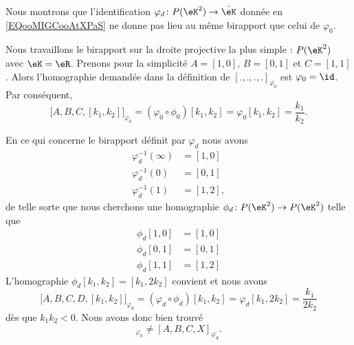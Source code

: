 \begin{example}        \label{EXooYCOYooWFSfUv}
    Nous montrons que l'identification \( \varphi_d\colon P(\eK^2)\to \hat\eK\) donnée en \eqref{EQooMIGCooAtXPaS} ne donne pas lieu au même birapport que celui de \( \varphi_0\). 

    Nous travaillons le birapport sur la droite projective la plus simple : \( P(\eK^2)\) avec \( \eK=\eR\). Prenons pour la simplicité \( A=[1,0]\), \( B=[0,1]\) et \( C=[1,1]\). Alors l'homographie demandée dans la définition de \( [.,.,.,.]_{\varphi_0}\) est \( \varphi_0=\id\). Par conséquent,
    \begin{equation}
        \big[ A,B,C,[k_1,k_2] \big]_{\varphi_0}=(\varphi_0\circ\phi_0)[k_1,k_2]=\varphi_0[k_1,k_2]=\frac{ k_1 }{ k_2 }.
    \end{equation}

    En ce qui concerne le birapport définit par \( \varphi_d\) nous avons
    \begin{subequations}
        \begin{align}
            \varphi_d^{-1}(\infty)&=[1,0]\\
            \varphi_d^{-1}(0)&=[0,1]\\
            \varphi_d^{-1}(1)&=[1,2],
        \end{align}
    \end{subequations}
    de telle sorte que nous cherchons une homographie \( \phi_d\colon P(\eK^2)\to P(\eK^2)\) telle que
    \begin{subequations}
        \begin{align}
            \phi_d[1,0]&=[1,0]\\
            \phi_d[0,1]&=[0,1]\\
            \phi_d[1,1]&=[1,2]
        \end{align}
    \end{subequations}
    L'homographie \( \phi_d[k_1,k_2]=[k_1,2k_2]\) convient et nous avons
    \begin{equation}
        \big[ A,B,C,D,[k_1,k_2] \big]_{\varphi_d}=(\varphi_d\circ\phi_d)[k_1,k_2]=\varphi_d[k_1,2k_2]=\frac{ k_1 }{ 2k_2 }
    \end{equation}
    dès que \( k_1k_2<0\). Nous avons donc bien trouvé
    \begin{equation}
        [A,B,C,X]_{\varphi_0}\neq [A,B,C,X]_{\varphi_d}.
    \end{equation}
\end{example}

